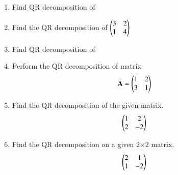 \begin{enumerate}[label=\thesection.\arabic*.,ref=\thesection.\theenumi]
\item Find QR decomposition of 
\\
\solution

\item Find the QR decomposition of $\begin{pmatrix}3&2\\1&4\end{pmatrix}$ 
\\
\solution

%
\item Find QR decomposition of 
\\
\solution

%
\item Perform the QR decomposition of matrix 
\begin{align}
 \mathbf{A}=\begin{pmatrix}1&2\\3&1\end{pmatrix}
\end{align}
\solution

\item Find the QR decomposition of the given matrix.
\begin{align}
    \begin{pmatrix}1&2\\2&-2\end{pmatrix}
\end{align}
\solution

%
\item Find the QR decomposition  on a given 2$\times$2 matrix. 
\begin{align}
    \begin{pmatrix}2&1\\1&-2\end{pmatrix}
\end{align}
%
\solution


\end{enumerate}
